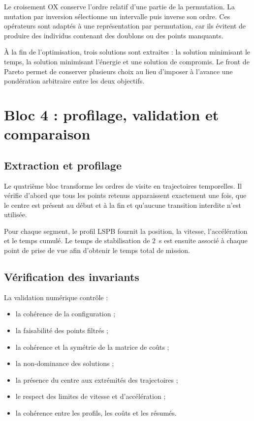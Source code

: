 Le croisement OX conserve l'ordre relatif d'une partie de la permutation. La mutation par inversion sélectionne un intervalle puis inverse son ordre. Ces opérateurs sont adaptés à une représentation par permutation, car ils évitent de produire des individus contenant des doublons ou des points manquants.

À la fin de l'optimisation, trois solutions sont extraites : la solution minimisant le temps, la solution minimisant l'énergie et une solution de compromis. Le front de Pareto permet de conserver plusieurs choix au lieu d'imposer à l'avance une pondération arbitraire entre les deux objectifs.

\section{Bloc 4 : profilage, validation et comparaison}
\label{sec:bloc_validation}

\subsection{Extraction et profilage}

Le quatrième bloc transforme les ordres de visite en trajectoires temporelles. Il vérifie d'abord que tous les points retenus apparaissent exactement une fois, que le centre est présent au début et à la fin et qu'aucune transition interdite n'est utilisée.

Pour chaque segment, le profil LSPB fournit la position, la vitesse, l'accélération et le temps cumulé. Le temps de stabilisation de $2$~s est ensuite associé à chaque point de prise de vue afin d'obtenir le temps total de mission.

\subsection{Vérification des invariants}

La validation numérique contrôle :

\begin{itemize}
\item la cohérence de la configuration ;
\item la faisabilité des points filtrés ;
\item la cohérence et la symétrie de la matrice de coûts ;
\item la non-dominance des solutions ;
\item la présence du centre aux extrémités des trajectoires ;
\item le respect des limites de vitesse et d'accélération ;
\item la cohérence entre les profils, les coûts et les résumés.
\end{itemize}


